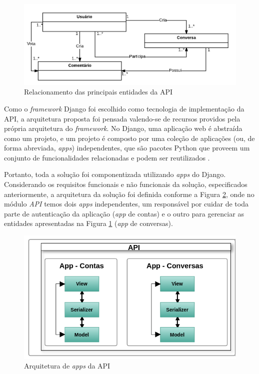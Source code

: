 	\begin{figure}[h!]
	\centering
	\includegraphics[scale=0.5]{figuras/entidades.png}
	\caption{Relacionamento das principais entidades da API}
	\label{fig:entidades}
	\end{figure}

	Como o \textit{framework} Django foi escolhido como tecnologia de implementação da API,
	a arquitetura proposta foi pensada valendo-se de 
	recursos providos pela própria arquitetura do \textit{framework}.
	No Django, uma aplicação web é abstraída como um projeto, e um projeto é composto por uma coleção de aplicações
	(ou, de forma abreviada, \textit{apps}) independentes, que
	são pacotes Python que proveem um conjunto de funcionalidades relacionadas e podem ser reutilizados \cite{django_apps}.

	Portanto, toda a solução foi componentizada utilizando \textit{apps} do 
	Django. Considerando os requisitos funcionais e não funcionais da solução, especificados anteriormente, a arquitetura da solução foi definida 
	conforme a Figura \ref{fig:arquitetura_api}, onde no módulo \textit{API} temos dois \textit{apps} independentes, um responsável
	por cuidar de toda parte de autenticação da aplicação (\textit{app} de contas) e o outro para gerenciar as entidades apresentadas na
	Figura \ref{fig:entidades} (\textit{app} de conversas). 

	\begin{figure}[h!]
	\centering
	\includegraphics[scale=0.8]{figuras/arquitetura_api.png}
	\caption{Arquitetura de \textit{apps} da API}
	\label{fig:arquitetura_api}
	\end{figure}

